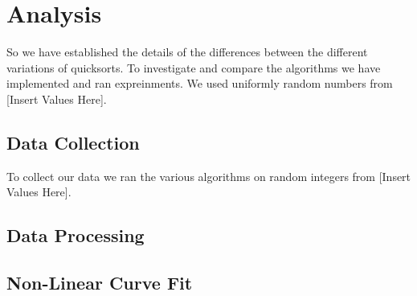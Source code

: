 \section{Analysis}
	\label{sec:Analysis}
	So we have established the details of the differences between the different variations of quicksorts.
	To investigate and compare the algorithms we have implemented and ran expreinments. 
	We used uniformly random numbers from [Insert Values Here].

	\subsection{Data Collection}
		\label{subsec:Analysis}
		To collect our data we ran the various algorithms on random integers from [Insert Values Here].
		

	\subsection{Data Processing}
		\label{subsec:DataProcessing}
		

	\subsection{Non-Linear Curve Fit}
		\label{subsec:CurveFit}


